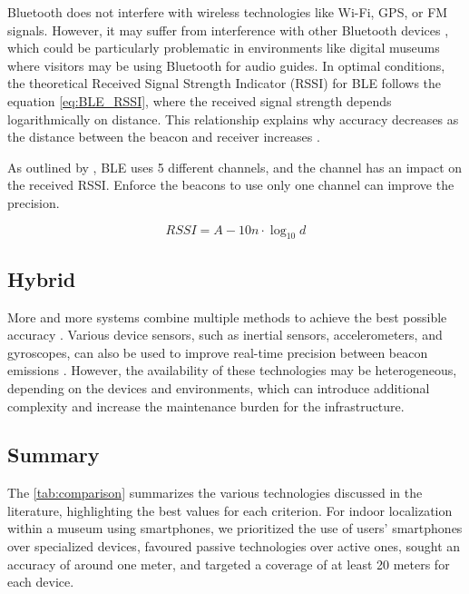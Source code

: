 Bluetooth does not interfere with wireless technologies like Wi-Fi, GPS, or FM signals. However, it may suffer from interference with other Bluetooth devices \cite{spachos_ble_2020}, which could be particularly problematic in environments like digital museums where visitors may be using Bluetooth for audio guides. In optimal conditions, the theoretical Received Signal Strength Indicator (RSSI) for BLE follows the equation \ref{eq:BLE_RSSI}, where the received signal strength depends logarithmically on distance. This relationship explains why accuracy decreases as the distance between the beacon and receiver increases \cite{spachos_ble_2020}. 

As outlined by \cite{barsocchi_detecting_2021}, BLE uses 5 different channels, and the channel has an impact on the received RSSI. Enforce the beacons to use only one channel can improve the precision.  

\begin{equation} \label{eq:BLE_RSSI}
    RSSI = A - 10n \cdot \log_{10}d
\end{equation}

\subsection{Hybrid}

More and more systems combine multiple methods to achieve the best possible accuracy \cite{shang_overview_2022}. Various device sensors, such as inertial sensors, accelerometers, and gyroscopes, can also be used to improve real-time precision between beacon emissions \cite{ali_locali_2017}. However, the availability of these technologies may be heterogeneous, depending on the devices and environments, which can introduce additional complexity and increase the maintenance burden for the infrastructure.

\subsection{Summary}

The \autoref{tab:comparison} summarizes the various technologies discussed in the literature, highlighting the best values for each criterion. For indoor localization within a museum using smartphones, we prioritized the use of users' smartphones over specialized devices, favoured passive technologies over active ones, sought an accuracy of around one meter, and targeted a coverage of at least 20 meters for each device.  

